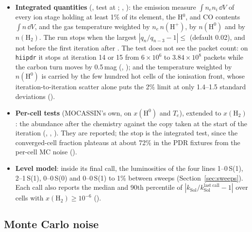 \begin{itemize}
\item \textbf{Integrated quantities} (,
  test at ; , ): the
  emission measure $\int n_e n_i\,\dd V$ of every ion stage holding at least
  1\% of its element, the H$^0$, \Htwo{} and CO contents $\int n\,\dd V$, and the
  gas temperature weighted by $n_e\,n(\mathrm H^+)$, by $n(\mathrm H^0)$ and by
  $n(\mathrm{H_2})$. The run stops when the largest
  $|q_n/q_{n-3}-1|\le$  (default 0.02), and not before the first
  iteration after . The test does not see the packet count:
  on \texttt{hiipdr} it stops at iteration 14 or 15 from $6\times10^6$ to
  $3.84\times10^8$ packets while the carbon turn moves by 0.5\,mag
  (, ); and the temperature weighted by $n(\mathrm H^0)$ is
  carried by the few hundred hot cells of the ionisation front, whose
  iteration-to-iteration scatter alone puts the 2\% limit at only 1.4--1.5
  standard deviations ().
\item \textbf{Per-cell tests} (MOCASSIN's own, on $x(\mathrm H^0)$ and $T_e$),
  extended to $x(\mathrm{H_2})$: the abundance after the chemistry against the
  copy taken at the start of the iteration (, , ). They are reported; the stop is the
  integrated test, since the converged-cell fraction plateaus at about 72\% in
  the PDR fixtures from the per-cell MC noise ().
\item \textbf{Level model}: inside its final call, the luminosities of the
  four \Htwo{} lines 1--0\,S(1), 2--1\,S(1), 0--0\,S(0) and 0--0\,S(1) to 1\% between
  sweeps (Section~\ref{sec:sweeps}). Each call also reports the median and
  90th percentile of $|k_{\mathrm{Sol}}/k_{\mathrm{Sol}}^{\mathrm{last\ call}}-1|$ over cells with
  $x(\mathrm{H_2})\ge10^{-6}$ ().
\end{itemize}

\subsection{Monte Carlo noise}
\label{sec:mcnoise}

